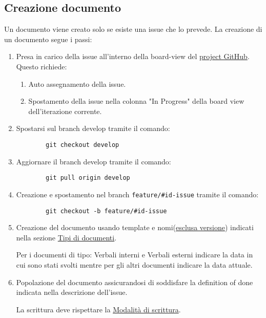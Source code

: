 \documentclass[a4paper, 12pt]{article}
\begin{document}
\subsection{Creazione documento}
\label{subsec:cre}
Un documento viene creato solo se esiste una issue che lo prevede.
La creazione di un documento segue i passi:
\begin{enumerate}
    \item Presa in carico della issue all'interno della board-view del \href{https://github.com/orgs/ALT-F4-eng/projects}{project GitHub}.
    Questo richiede:
    \begin{enumerate}
        \item Auto assegnamento della issue.
        \item Spostamento della issue nella colonna "In Progress" della board view dell'iterazione corrente.
    \end{enumerate}

    \item Spostarsi sul branch develop tramite il comando:
    \begin{lstlisting}
        git checkout develop
    \end{lstlisting}
     
    \item Aggiornare il branch develop tramite il comando: 
    \begin{lstlisting}
        git pull origin develop
    \end{lstlisting}
    
    \item Creazione e spostamento nel branch \lstinline|feature/#id-issue| tramite il comando:
    \begin{lstlisting}
        git checkout -b feature/#id-issue
    \end{lstlisting}

    \item Creazione del documento usando template e nomi(\underline{esclusa versione}) indicati nella sezione \hyperref[subsec:docs]{Tipi di documenti}.
    
    Per i documenti di tipo: Verbali interni e Verbali esterni indicare la data in cui sono stati svolti mentre per gli altri documenti indicare la data attuale.
    
    \item Popolazione del documento assicurandosi di soddisfare la definition of done indicata nella descrizione dell'issue.
    
    La scrittura deve rispettare la \hyperref[subsec:mods]{Modalità di scrittura}. 
    

\end{enumerate}
\end{document}
